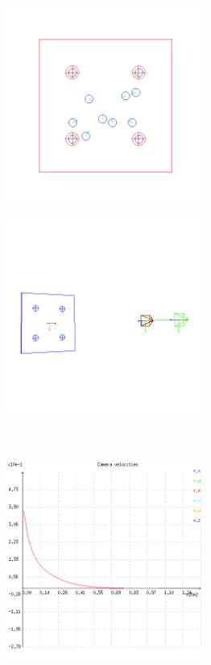 \begin{figure}[ht!]
\centering
\begin{mdframed}[linecolor=black!30,backgroundcolor=black!5]
  \centering
  \begin{subfigure}{.48\textwidth}
    \centering
    \includegraphics[width=65mm]{figures/plots/ex2pimage.png}
    \caption{}
    \label{fig:ex2cimage}
  \end{subfigure}
  \begin{subfigure}{.48\textwidth}
    \centering
    \includegraphics[width=65mm]{figures/plots/ex2pscene.png}
    \caption{}
    \label{fig:ex2cscene}
  \end{subfigure}
  \\
  \begin{subfigure}{.48\textwidth}
    \centering
    \includegraphics[width=65mm]{figures/plots/ex2cvelocity.png}

\end{subfigure}
\end{mdframed}
\end{figure}
